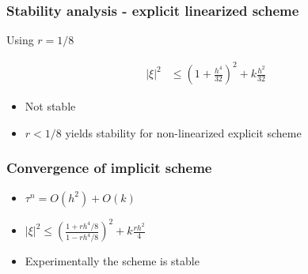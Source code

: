 \documentclass[screen]{beamer}
\begin{document}
\begin{frame}
\frametitle{Stability analysis - explicit linearized scheme}

Using $r = 1/8$ 

\begin{align*}
|\xi |^2 &\le \left(1 + \frac{h^4}{32}\right)^2 + k\frac{h^2}{32} 
\end{align*}

\begin{itemize}
\item Not stable
\item $r < 1/8$ yields stability for non-linearized explicit scheme
\end{itemize}
\end{frame}

\begin{frame}
\frametitle{Convergence of implicit scheme}

\begin{itemize}
\item $\tau ^n = O(h^2) + O(k) $
\item $|\xi |^2 \le \left(\frac{1+rh^4/8}{1-rh^4/8}\right)^2 + k\frac{rh^2}{4}$
\item Experimentally the scheme is stable
\end{itemize}

\end{frame}

\begin{frame}



\end{frame}
\end{document}
